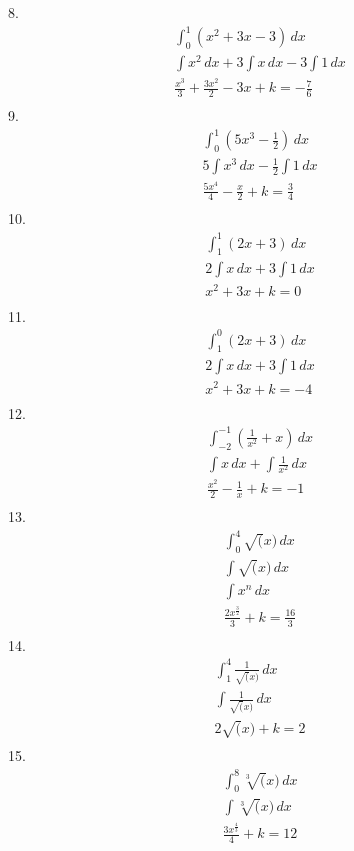 \documentclass{article}
\begin{document}
8.
\begin{gather*}
    \int_{0}^{1} (x^2 + 3x - 3)\, dx
\\
    \int x^2\,dx + 3\int x\,dx - 3\int 1\,dx
\\
    \frac{x^3}{3} + \frac{3x^2}{2} - 3x + k = -\frac{7}{6}
\\
\end{gather*}
9.
\begin{gather*}
    \int_{0}^{1} (5x^3-\frac{1}{2})\, dx
\\
    5\int x^3\,dx - \frac{1}{2}\int 1\,dx
\\
    \frac{5x^4}{4} - \frac{x}{2} + k = \frac{3}{4}
\\
\end{gather*}
10.
\begin{gather*}
    \int_{1}^{1} (2x+3)\, dx
\\
    2\int x\,dx + 3\int 1\,dx
\\
    x^2 + 3x + k = 0
\\
\end{gather*}
11.
\begin{gather*}
    \int_{1}^{0} (2x+3)\, dx
\\
    2\int x\,dx + 3\int 1\,dx
\\
    x^2 + 3x + k = -4
\\
\end{gather*}
12.
\begin{gather*}
    \int_{-2}^{-1} (\frac{1}{x^2}+x)\, dx
\\
    \int x\,dx + \int \frac{1}{x^2} \,dx
\\
    \frac{x^2}{2} - \frac{1}{x} + k = -1
\\
\end{gather*}
13.
\begin{gather*}
    \int_{0}^{4} \sqrt(x)\, dx
\\
    \int \sqrt(x)\,dx
\\
    \int x^n\,dx
\\
    \frac{2x^{\frac{3}{2}}}{3} + k = \frac{16}{3}
\\
\end{gather*}
14.
\begin{gather*}
    \int_{1}^{4} \frac{1}{\sqrt(x)}\, dx
\\
    \int \frac{1}{\sqrt(x)}\,dx
\\
    2\sqrt(x) + k = 2
\\
\end{gather*}
15.
\begin{gather*}
    \int_{0}^{8} \sqrt[3](x)\, dx
\\
    \int \sqrt[3](x)\,dx
\\
    \frac{3x^{\frac{4}{3}}}{4} + k = 12
\\
\end{gather*}
\end{document}
